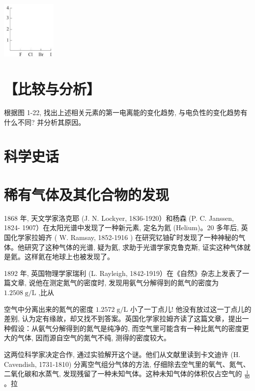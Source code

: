 \documentclass[10pt]{article}
\begin{document}
\begin{center}
\includegraphics[max width=0.2\textwidth]{images/0190e026-5a11-7df7-bd27-54d09026ba7a_29_214727.jpg}
\end{center}

\section*{【比较与分析】}

根据图 1-22, 找出上述相关元素的第一电离能的变化趋势, 与电负性的变化趋势有什么不同? 并分析其原因。

\section*{科学史话}

\section*{稀有气体及其化合物的发现}

1868 年, 天文学家洛克耶 (J. N. Lockyer, 1836-1920）和杨森 (P. C. Janssen, 1824- 1907）在太阳光谱中发现了一种新元素, 定名为氦 (Helium)。20 多年后, 英国化学家拉姆齐 ( W. Ramsay, 1852-1916 ) 在研究钇铀矿时发现了一种神秘的气体。他研究了这种气体的光谱, 疑为氦, 求助于光谱学家克鲁克斯, 证实这种气体就是氦。这样氦在地球上也被发现了。

1892 年, 英国物理学家瑞利 (L. Rayleigh, 1842-1919）在《自然》杂志上发表了一篇文章, 说他在测定氮气的密度时, 发现用氨气分解得到的氮气的密度为 \({1.2508}\mathrm{\;g}/\mathrm{L}\) ,比从

空气中分离出来的氮气的密度 \({1.2572}\mathrm{\;g}/\mathrm{L}\) 小了一丁点儿! 他没有放过这一丁点儿的差别, 认为定有缘故，却又找不到答案。英国化学家拉姆齐读了这篇文章，提出一种假设：从氨气分解得到的氮气是纯净的, 而空气里可能含有一种比氮气的密度更大的气体, 因而源自空气的氮气不纯, 测得的密度较大。

这两位科学家决定合作, 通过实验解开这个谜。他们从文献里读到卡文迪许 (H. Cavendish, 1731-1810) 分离空气组分气体的方法, 仔细除去空气里的氧气、氮气、二氧化碳和水蒸气, 发现残留了一种未知气体。这种未知气体的体积仅占空气的 \(\frac{1}{80}\) 。拉
\end{document}

